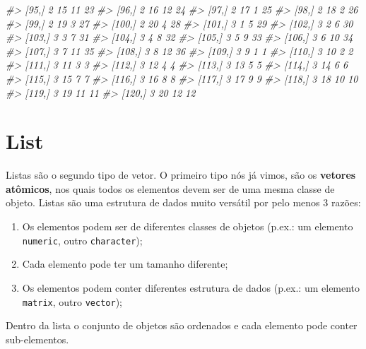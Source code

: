 \documentclass[]{book}
\newenvironment{Shaded}{\begin{snugshade}}{\end{snugshade}}
\newcommand{\CommentTok}[1]{\textcolor[rgb]{0.56,0.35,0.01}{\textit{#1}}}
\providecommand{\tightlist}{%
  \setlength{\itemsep}{0pt}\setlength{\parskip}{0pt}}
\begin{document}
\begin{Shaded}
\begin{Highlighting}[]
\CommentTok{#>  [95,]   2     15      11     23}
\CommentTok{#>  [96,]   2     16      12     24}
\CommentTok{#>  [97,]   2     17       1     25}
\CommentTok{#>  [98,]   2     18       2     26}
\CommentTok{#>  [99,]   2     19       3     27}
\CommentTok{#> [100,]   2     20       4     28}
\CommentTok{#> [101,]   3      1       5     29}
\CommentTok{#> [102,]   3      2       6     30}
\CommentTok{#> [103,]   3      3       7     31}
\CommentTok{#> [104,]   3      4       8     32}
\CommentTok{#> [105,]   3      5       9     33}
\CommentTok{#> [106,]   3      6      10     34}
\CommentTok{#> [107,]   3      7      11     35}
\CommentTok{#> [108,]   3      8      12     36}
\CommentTok{#> [109,]   3      9       1      1}
\CommentTok{#> [110,]   3     10       2      2}
\CommentTok{#> [111,]   3     11       3      3}
\CommentTok{#> [112,]   3     12       4      4}
\CommentTok{#> [113,]   3     13       5      5}
\CommentTok{#> [114,]   3     14       6      6}
\CommentTok{#> [115,]   3     15       7      7}
\CommentTok{#> [116,]   3     16       8      8}
\CommentTok{#> [117,]   3     17       9      9}
\CommentTok{#> [118,]   3     18      10     10}
\CommentTok{#> [119,]   3     19      11     11}
\CommentTok{#> [120,]   3     20      12     12}
\end{Highlighting}
\end{Shaded}

\section{List}\label{list}

Listas são o segundo tipo de vetor. O primeiro tipo nós já vimos, são os
\textbf{vetores atômicos}, nos quais todos os elementos devem ser de uma
mesma classe de objeto. Listas são uma estrutura de dados muito versátil
por pelo menos 3 razões:

\begin{enumerate}
\def\labelenumi{\arabic{enumi}.}
\tightlist
\item
  Os elementos podem ser de diferentes classes de objetos (p.ex.: um
  elemento \texttt{numeric}, outro \texttt{character});
\item
  Cada elemento pode ter um tamanho diferente;
\item
  Os elementos podem conter diferentes estrutura de dados (p.ex.: um
  elemento \texttt{matrix}, outro \texttt{vector});
\end{enumerate}

Dentro da lista o conjunto de objetos são ordenados e cada elemento pode
conter sub-elementos.
\end{document}
